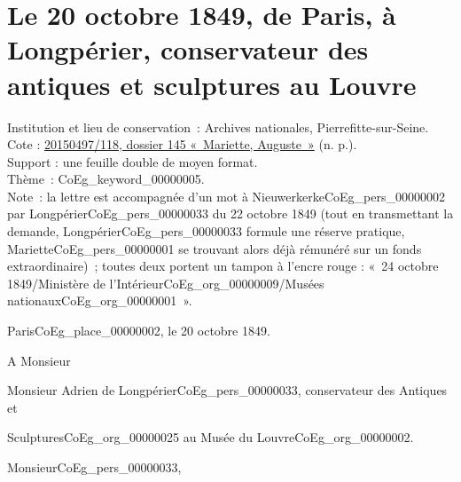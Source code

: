 \documentclass{book}
\begin{document}
\hypertarget{CoEg_Mariette_1849-10-20}{}

\section*{Le 20  octobre 1849, de Paris, à Longpérier, conservateur des antiques et sculptures au Louvre}
 \label{labCoEg_Mariette_1849-10-20}
{\footnotesize
\noindent Institution et lieu de conservation~: Archives nationales, Pierrefitte-sur-Seine.\\
Cote : \hyperlink{CoEg_Mariette_ms_001}{20150497/118, dossier 145 «~Mariette, Auguste~»} (n. p.).\\
Support : une feuille double de moyen format.\\
Thème~: \gls{CoEg_keyword_00000005}.\\
Note~: la lettre est accompagnée d’un mot à Nieuwerkerke\gls{CoEg_pers_00000002} par Longpérier\gls{CoEg_pers_00000033} du 22 octobre 1849 (tout en transmettant la demande, Longpérier\gls{CoEg_pers_00000033} formule une réserve pratique, Mariette\gls{CoEg_pers_00000001} se trouvant alors déjà rémunéré sur un fonds extraordinaire)~; toutes deux portent un tampon à l’encre rouge : «~24 octobre 1849/Ministère de l’Intérieur\gls{CoEg_org_00000009}/Musées nationaux\gls{CoEg_org_00000001}~».}
\begin{flushright}
Paris\gls{CoEg_place_00000002}, le 20 octobre 1849.
\end{flushright}
A Monsieur
\begin{center} Monsieur Adrien de Longpérier\gls{CoEg_pers_00000033}, conservateur des Antiques et\end{center}
\begin{flushright}Sculptures\gls{CoEg_org_00000025} au Musée du Louvre\gls{CoEg_org_00000002}.\end{flushright}

\hspace{1cm} Monsieur\gls{CoEg_pers_00000033},\\
\end{document}
